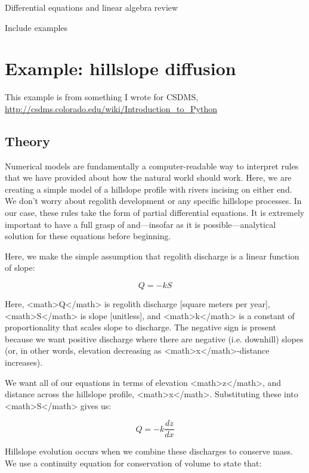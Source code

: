 \documentclass[a4paper,10pt]{scrartcl}
\begin{document}
Differential equations and linear algebra review

Include examples

\section{Example: hillslope diffusion}

This example is from something I wrote for CSDMS, \url{http://csdms.colorado.edu/wiki/Introduction_to_Python}

\subsection{Theory}

Numerical models are fundamentally a computer-readable way to interpret rules that we have provided about how the natural world should work. Here, we are creating a simple model of a hillslope profile with rivers incising on either end. We don't worry about regolith development or any specific hillslope processes. In our case, these rules take the form of partial differential equations. It is extremely important to have a full grasp of and—insofar as it is possible—analytical solution for these equations before beginning.

Here, we make the simple assumption that regolith discharge is a linear function of slope:

\begin{equation}
Q = - k S
\end{equation}

Here, <math>Q</math> is regolith discharge [square meters per year], <math>S</math> is slope [unitless], and <math>k</math> is a constant of proportionality that scales slope to discharge. The negative sign is present because we want positive discharge where there are negative (i.e. downhill) slopes (or, in other words, elevation decreasing as <math>x</math>-distance increases).

We want all of our equations in terms of elevation <math>z</math>, and distance across the hillslope profile, <math>x</math>. Substituting these into <math>S</math> gives us:

\begin{equation}
Q = - k \frac{dz}{dx}
\end{equation}

Hillslope evolution occurs when we combine these discharges to conserve mass. We use a continuity equation for conservation of volume to state that:
\end{document}

